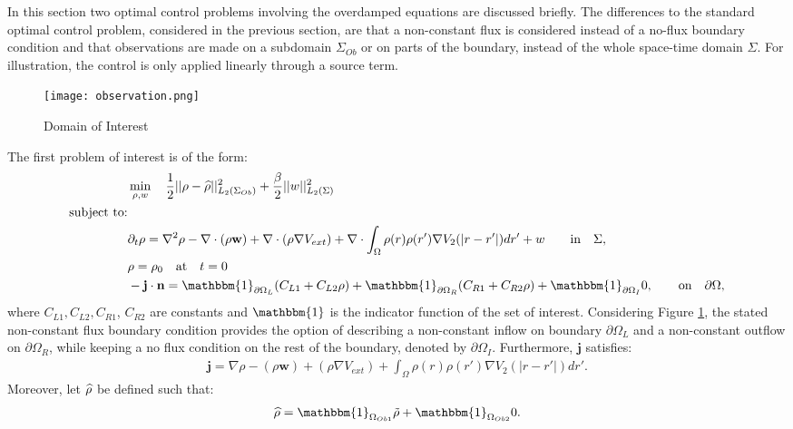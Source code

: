 

In this section two optimal control problems involving the overdamped equations are discussed briefly. The differences to the standard optimal control problem, considered in the previous section, are that a non-constant flux is considered instead of a no-flux boundary condition and that observations are made on a subdomain $\Sigma_{Ob}$ or on parts of the boundary, instead of the whole space-time domain $\Sigma$. For illustration, the control is only applied linearly through a source term. 
\begin{figure}[h]
	\texttt{[image: observation.png]}
	\caption{Domain of Interest}
	\label{Observation1}
\end{figure}
The first problem of interest is of the form:
\begin{align*}
&\min_{\Sta, w} \quad \frac{1}{2}|| \Sta -\widehat \Sta||^2_{L_2( \Sigma_{Ob})} + \frac{\beta}{2}||w||^2_{L_2(\Sigma)}\\
\text{subject to:}\\
&\partial_t \rho = \nabla^2 \rho - \nabla \cdot (\rho \mathbf{w}) +\nabla \cdot (\rho \nabla V_{ext}) + \nabla \cdot \int_\Omega \rho(r) \rho(r') \nabla V_2(|r-r'|) dr' + w \quad  \quad\text{in} \quad \Sigma,\notag\\
& \rho = \rho_0 \quad \text{at} \quad t=0 \notag\\
& - \mathbf{j} \cdot \nor = \mathbbm{1}_{\partial \Omega_L}( C_{L1}  + C_{L2}\Sta) +\mathbbm{1}_{\partial \Omega_R} ( C_{R1}  + C_{R2}\Sta) +\mathbbm{1}_{\partial \Omega_I} 0, \quad  \quad\text{on} \quad \partial \Omega, 
\end{align*}
where $C_{L1}, C_{L2}, C_{R1}$, $C_{R2}$ are constants and $\mathbbm{1}$ is the indicator function of the set of interest. Considering Figure \ref{Observation1}, the stated non-constant flux boundary condition provides the option of describing a non-constant inflow on boundary $\partial \Omega_L$ and a non-constant outflow on $\partial \Omega_R$, while keeping a no flux condition on the rest of the boundary, denoted by $\partial \Omega_I$.
Furthermore, $\mathbf{j}$ satisfies:
\begin{align*}
\mathbf{j}=\nabla \rho - (\rho \mathbf{w}) +(\rho \nabla V_{ext}) +  \int_\Omega \rho(r) \rho(r') \nabla V_2(|r-r'|) dr'.
\end{align*}
Moreover, let $\widehat {\rho}$ be defined such that:
\begin{align*}
\widehat \Sta = \mathbbm{1}_{ \Omega_{Ob1}} \tilde \Sta  +\mathbbm{1}_{ \Omega_{Ob2}} 0.
\end{align*}
